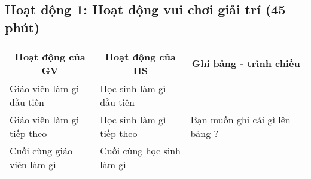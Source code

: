 \documentclass[12pt,a4paper]{article}
\newcommand*{\thead}[1]{\multicolumn{1}{c}{\bfseries #1}}
\begin{document}
	\subsection{Hoạt động 1: Hoạt động vui chơi giải trí (45 phút)}
	\begin{longtable}{ p{0.3\linewidth} p{0.3\linewidth} p{0.4\linewidth} }
		\toprule
		\thead{Hoạt động của GV}
		& 
		\thead{Hoạt động của HS}
		& 
		\thead{Ghi bảng - trình chiếu}
		\\ \midrule
		\endhead
		Giáo viên làm gì đầu tiên
		&
		Học sinh làm gì đầu tiên
		&  
		\multirow[t]{3}{*}{
			Bạn muốn ghi cái gì lên bảng ?
		}
		\\
		Giáo viên làm gì tiếp theo
		& 
		Học sinh làm gì tiếp theo
		&  
		\\
		Cuối cùng giáo viên làm gì
		&
		Cuối cùng học sinh làm gì
		&
		\\ \bottomrule
	\end{longtable}
\end{document}
